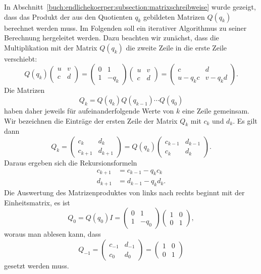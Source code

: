 In Abschnitt~\ref{buch:endlichekoerper:subsection:matrixschreibweise}
wurde gezeigt, dass das Produkt der aus den Quotienten $q_k$ gebildeten
Matrizen $Q(q_k)$ berechnet werden muss.
Im Folgenden soll ein iterativer Algorithmus zu seiner Berechnung
hergeleitet werden.
Dazu beachten wir zunächst, dass die Multiplikation mit der Matrix
$Q(q_k)$ die zweite Zeile in die erste Zeile verschiebt:
\[
Q(q_k)
\begin{pmatrix}
u&v\\
c&d\\
\end{pmatrix}
=
\begin{pmatrix}0&1\\1&-q_k\end{pmatrix}
\begin{pmatrix}
u&v\\
c&d
\end{pmatrix}
=
\begin{pmatrix}
c&d\\
u-q_kc&v-q_kd
\end{pmatrix}.
\]
Die Matrizen
\[
Q_k = Q(q_k)Q(q_{k-1})\cdots Q(q_0)
\]
haben daher jeweils für aufeinanderfolgende Werte von $k$ eine Zeile
gemeinsam.
Wir bezeichnen die Einträge der ersten Zeile der Matrix $Q_k$ mit
$c_k$ und $d_k$.
Es gilt dann
\[
Q_k
=
\begin{pmatrix}
c_{k}  &d_{k}  \\
c_{k+1}&d_{k+1}
\end{pmatrix}
=
Q(q_k)
\begin{pmatrix}
c_{k-1}&d_{k-1}\\
c_{k}  &d_{k}
\end{pmatrix}.
\]
Daraus ergeben sich die Rekursionsformeln
\begin{equation}
\begin{aligned}
c_{k+1}&=c_{k-1}-q_kc_k\\
d_{k+1}&=d_{k-1}-q_kd_k.
\end{aligned}
\label{buch:endlichekoerper:eqn:cdrekursion}
\end{equation}
Die Auswertung des Matrizenproduktes von links nach rechts beginnt mit
der Einheitsmatrix, es ist
\[
Q_0
=
Q(q_0) I
=
\begin{pmatrix}
0&1\\
1&-q_0
\end{pmatrix}
\begin{pmatrix}
1&0\\0&1\end{pmatrix},
\]
woraus man ablesen kann, dass
\begin{equation}
Q_{-1}
=
\begin{pmatrix}
c_{-1}&d_{-1}\\
c_0&d_0
\end{pmatrix}
=
\begin{pmatrix}
1&0\\
0&1
\end{pmatrix}
\label{buch:endlichekoerper:eqn:cdinitial}
\end{equation}
gesetzt werden muss.

